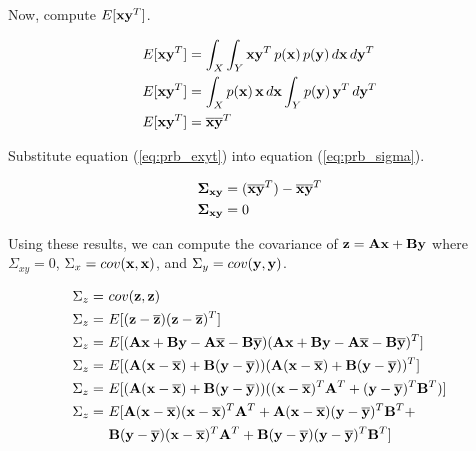 Now, compute $E[\mathbf{x}\mathbf{y}^T]$.

\begin{align}
  E[\mathbf{x}\mathbf{y}^T] &= \int_X \int_Y \mathbf{x}\mathbf{y}^T \,p(\mathbf{x})
    \,p(\mathbf{y}) \,d\mathbf{x} \,d\mathbf{y}^T \nonumber \\
  E[\mathbf{x}\mathbf{y}^T] &= \int_X p(\mathbf{x}) \,\mathbf{x} \,d\mathbf{x}
    \int_Y p(\mathbf{y}) \,\mathbf{y}^T \,d\mathbf{y}^T \nonumber \\
  E[\mathbf{x}\mathbf{y}^T] &= \overline{\mathbf{x}}\overline{\mathbf{y}}^T \label{eq:prb_exyt}
\end{align}

Substitute equation (\ref{eq:prb_exyt}) into equation (\ref{eq:prb_sigma}).

\begin{align*}
  \mathbf{\Sigma}_{\mathbf{x}\mathbf{y}} &= (\overline{\mathbf{x}}\overline{\mathbf{y}}^T) -
    \overline{\mathbf{x}}\overline{\mathbf{y}}^T \\
  \mathbf{\Sigma}_{\mathbf{x}\mathbf{y}} &= 0
\end{align*}

Using these results, we can compute the covariance of
$\mathbf{z} = \mathbf{A}\mathbf{x} + \mathbf{B}\mathbf{y}$ where $\Sigma_{xy} = 0$,
$\Sigma_x = cov(\mathbf{x}, \mathbf{x})$, and $\Sigma_y = cov(\mathbf{y}, \mathbf{y})$.

\begin{align*}
  \Sigma_z =~& cov(\mathbf{z}, \mathbf{z}) \\
  \Sigma_z =~& E[(\mathbf{z} - \overline{\mathbf{z}})(\mathbf{z} - \overline{\mathbf{z}})^T] \\
  \Sigma_z =~& E[(\mathbf{A}\mathbf{x} + \mathbf{B}\mathbf{y} - \mathbf{A}\overline{\mathbf{x}} -
    \mathbf{B}\overline{\mathbf{y}})(\mathbf{A}\mathbf{x} + \mathbf{B}\mathbf{y} -
    \mathbf{A}\overline{\mathbf{x}} - \mathbf{B}\overline{\mathbf{y}})^T] \\
  \Sigma_z =~& E[(\mathbf{A}(\mathbf{x} - \overline{\mathbf{x}}) +
    \mathbf{B}(\mathbf{y} - \overline{\mathbf{y}}))
    (\mathbf{A}(\mathbf{x} - \overline{\mathbf{x}}) +
     \mathbf{B}(\mathbf{y} - \overline{\mathbf{y}}))^T] \\
  \Sigma_z =~& E[(\mathbf{A}(\mathbf{x} - \overline{\mathbf{x}}) +
    \mathbf{B}(\mathbf{y} - \overline{\mathbf{y}}))
    ((\mathbf{x} - \overline{\mathbf{x}})^T\mathbf{A}^T +
     (\mathbf{y} - \overline{\mathbf{y}})^T\mathbf{B}^T)] \\
  \Sigma_z =~& E[
    \mathbf{A}(\mathbf{x} - \overline{\mathbf{x}})(\mathbf{x} - \overline{\mathbf{x}})^T\mathbf{A}^T +
    \mathbf{A}(\mathbf{x} - \overline{\mathbf{x}})(\mathbf{y} - \overline{\mathbf{y}})^T\mathbf{B}^T + \\
    &\mathbf{B}(\mathbf{y} - \overline{\mathbf{y}})(\mathbf{x} - \overline{\mathbf{x}})^T\mathbf{A}^T +
    \mathbf{B}(\mathbf{y} - \overline{\mathbf{y}})(\mathbf{y} - \overline{\mathbf{y}})^T\mathbf{B}^T]
\end{align*}

